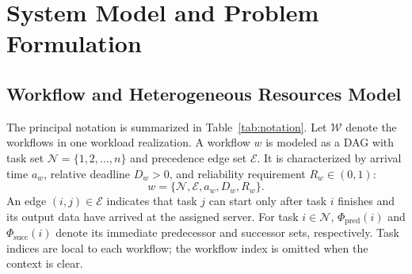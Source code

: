 \documentclass[lettersize,journal]{IEEEtran}
\begin{document}
\section{System Model and Problem Formulation}
\label{sec:model}

\subsection{Workflow and Heterogeneous Resources Model}

The principal notation is summarized in Table~\ref{tab:notation}.
Let $\mathcal W$ denote the workflows in one workload realization.
A workflow $w$ is modeled as a DAG with task set
$\mathcal{N}=\{1,2,\ldots,n\}$ and precedence edge set
$\mathcal{E}$. It is characterized by arrival time $a_w$,
relative deadline $D_w>0$, and reliability requirement $R_w\in(0,1)$:
\begin{equation}
    w=\{\mathcal{N},\mathcal{E},a_w,D_w,R_w\}.
\end{equation}
An edge $(i,j)\in\mathcal{E}$ indicates that task $j$ can
start only after task $i$ finishes and its output data
have arrived at the assigned server.
For task $i\in\mathcal{N}$, $\Phi_{\mathrm{pred}}(i)$ and
$\Phi_{\mathrm{succ}}(i)$ denote its immediate predecessor
and successor sets, respectively.
Task indices are local to each workflow; the workflow index
is omitted when the context is clear.
\end{document}
